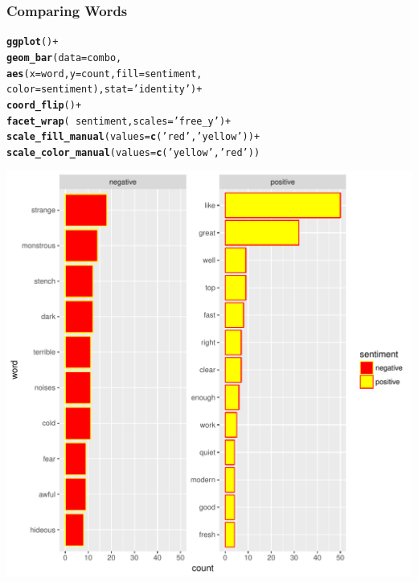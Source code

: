 \documentclass{beamer}\usepackage[]{graphicx}\usepackage[]{color}
\makeatletter
\def\maxwidth{ %
  \ifdim\Gin@nat@width>\linewidth
    \linewidth
  \else
    \Gin@nat@width
  \fi
}
\newcommand{\hlstr}[1]{\textcolor[rgb]{0.192,0.494,0.8}{#1}}%
\newcommand{\hlopt}[1]{\textcolor[rgb]{0,0,0}{#1}}%
\newcommand{\hlstd}[1]{\textcolor[rgb]{0.345,0.345,0.345}{#1}}%
\newcommand{\hlkwc}[1]{\textcolor[rgb]{0.333,0.667,0.333}{#1}}%
\newcommand{\hlkwd}[1]{\textcolor[rgb]{0.737,0.353,0.396}{\textbf{#1}}}%
\newenvironment{kframe}{%
 \def\at@end@of@kframe{}%
 \ifinner\ifhmode%
  \def\at@end@of@kframe{\end{minipage}}%
  \begin{minipage}{\columnwidth}%
 \fi\fi%
 \def\FrameCommand##1{\hskip\@totalleftmargin \hskip-\fboxsep
 \colorbox{shadecolor}{##1}\hskip-\fboxsep
     \hskip-\linewidth \hskip-\@totalleftmargin \hskip\columnwidth}%
 \MakeFramed {\advance\hsize-\width
   \@totalleftmargin\z@ \linewidth\hsize
   \@setminipage}}%
 {\par\unskip\endMakeFramed%
 \at@end@of@kframe}
\newenvironment{knitrout}{}{} %
\makeatother
\begin{document}
\begin{frame}
\frametitle{Comparing Words}
\begin{knitrout}
\color{fgcolor}\begin{kframe}
\begin{alltt}
\hlkwd{ggplot}\hlstd{()}\hlopt{+}
  \hlkwd{geom_bar}\hlstd{(}\hlkwc{data}\hlstd{=combo,}
           \hlkwd{aes}\hlstd{(}\hlkwc{x}\hlstd{=word,}\hlkwc{y}\hlstd{=count,} \hlkwc{fill}\hlstd{=sentiment,}
               \hlkwc{color}\hlstd{=sentiment),}\hlkwc{stat}\hlstd{=}\hlstr{'identity'}\hlstd{)}\hlopt{+}
  \hlkwd{coord_flip}\hlstd{()}\hlopt{+}
  \hlkwd{facet_wrap}\hlstd{(}\hlopt{~}\hlstd{sentiment,}\hlkwc{scales}\hlstd{=}\hlstr{'free_y'}\hlstd{)}\hlopt{+}
  \hlkwd{scale_fill_manual}\hlstd{(}\hlkwc{values}\hlstd{=}\hlkwd{c}\hlstd{(}\hlstr{'red'}\hlstd{,}\hlstr{'yellow'}\hlstd{))}\hlopt{+}
\hlkwd{scale_color_manual}\hlstd{(}\hlkwc{values}\hlstd{=}\hlkwd{c}\hlstd{(}\hlstr{'yellow'}\hlstd{,}\hlstr{'red'}\hlstd{))}
\end{alltt}
\end{kframe}
\includegraphics[width=\maxwidth]{figure/unnamed-chunk-14-1} 

\end{knitrout}
\framebreak
\end{frame}
\end{document}
